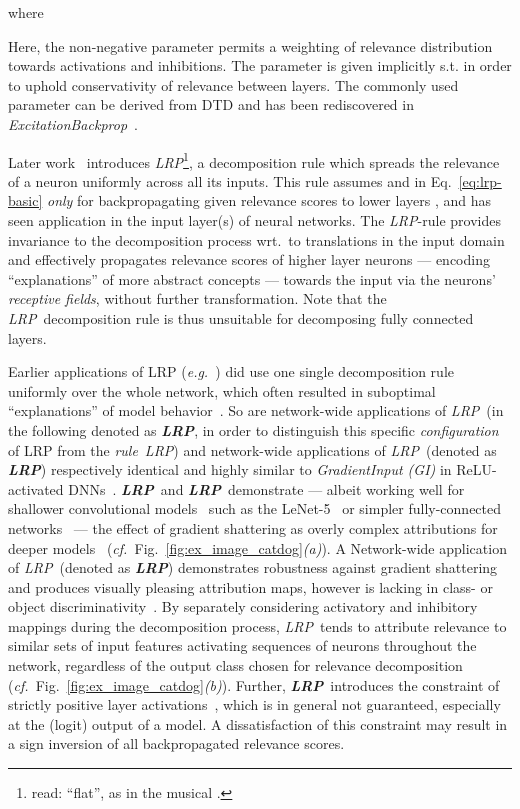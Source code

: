 \documentclass[conference]{IEEEtran}
\def\eg{\emph{e.g.~}}
\def\cf{\emph{cf.~}}
\def\wrt{wrt.~}
\newcommand{\lrpz}[0]{\emph{LRP}}
\newcommand{\LRPZ}[0]{\textbf{\lrpz}}
\newcommand{\lrpeps}[0]{\emph{LRP}}
\newcommand{\LRPEPS}[0]{\textbf{\lrpeps}}
\newcommand{\lrpalphabeta}[0]{\emph{LRP}}
\newcommand{\LRPALPHABETA}[0]{\textbf{\lrpalphabeta}}
\newcommand{\lrpflat}[0]{\emph{LRP}}
\begin{document}
where

Here, the non-negative  parameter permits a weighting of relevance distribution towards activations and inhibitions.
The  parameter is given implicitly s.t.  in order to uphold conservativity of relevance between layers.
The commonly used parameter 
can be derived from DTD and has been rediscovered in \emph{ExcitationBackprop}~\cite{zhang2018top}.


Later work~\cite{bach2016controlling,lapuschkin2017understanding} introduces \lrpflat\footnote{read: ``flat'', as in the musical .},
a decomposition rule which spreads the relevance of a neuron uniformly across all its inputs.
This rule assumes  and  in Eq.~\eqref{eq:lrp-basic} \emph{only} for backpropagating given relevance scores  to lower layers ,
and has seen application in the input layer(s) of neural networks.
The \lrpflat-rule provides invariance to the decomposition process \wrt to translations in the input domain
and effectively propagates relevance scores of higher layer neurons --- encoding ``explanations'' of more abstract concepts --- towards the input via the neurons' \emph{receptive fields}, without further transformation.
Note that the \lrpflat~decomposition rule is thus unsuitable for decomposing fully connected layers.


Earlier applications of LRP (\eg \cite{bach2015pixel,lapuschkin2016analyzing}) did use one single decomposition rule uniformly over the whole network,
which often resulted in suboptimal ``explanations'' of model behavior~\cite{montavon2019layer}.
So are network-wide applications of \lrpz~(in the following denoted as \LRPZ, in order to distinguish this specific \emph{configuration} of LRP from the \emph{rule}~\lrpz) and network-wide applications of \lrpeps~(denoted as \LRPEPS) respectively identical and highly similar to \emph{GradientInput (GI)} in ReLU-activated DNNs~\cite{ancona2019gradient}.
\LRPZ~and \LRPEPS~demonstrate --- albeit working well for shallower convolutional models~\cite{lapuschkin2016lrp, horst2019explaining} such as the \mbox{LeNet-5}~\cite{lecun1998gradient}
or simpler fully-connected networks~\cite{StuJNM16} --- the effect of gradient shattering as overly complex attributions for deeper models~\cite{montavon2019layer,ancona2019gradient} (\cf Fig.~\ref{fig:ex_image_catdog}\emph{(a)}).
A Network-wide application of \lrpalphabeta~(denoted as \LRPALPHABETA) demonstrates robustness against gradient shattering and produces visually pleasing attribution maps,
however is lacking in class- or object discriminativity~\cite{gu2018understanding,montavon2019layer}.
By separately considering activatory and inhibitory mappings  during the decomposition process, \lrpalphabeta~tends to attribute relevance to similar sets of input features activating sequences of neurons throughout the network, regardless of the output class chosen for relevance decomposition (\cf Fig.~\ref{fig:ex_image_catdog}\emph{(b)}).
Further, \LRPALPHABETA~introduces the constraint of strictly positive layer activations~\cite{montavon2017explaining},
which is in general not guaranteed, especially at the (logit) output of a model.
A dissatisfaction of this constraint may result in a sign inversion of all backpropagated relevance scores.
\end{document}
